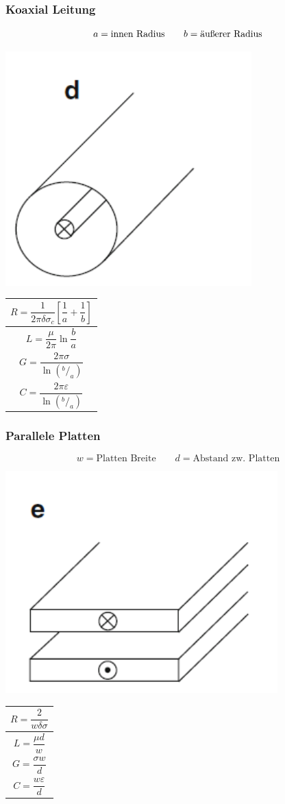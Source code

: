 \subsubsection{Koaxial Leitung}
\[
    a = \text{innen Radius} \qquad b = \text{äußerer Radius} \\
\]

\includegraphics[width=0.4\columnwidth]{Figures/Koaxialleitung.png}
{\renewcommand*{\arraystretch}{0.2}
\begin{tabularx}{0.5\columnwidth}{|X|}
    \hline
    \[R=\frac{1}{2\pi\delta\sigma_c}\left[\frac{1}{a}+\frac{1}{b}\right]\] \\
    \hline
    \[L=\frac{\mu}{2\pi}\ln\frac{b}{a}\]                                   \\
    \hline
    \[G=\frac{2\pi\sigma}{\ln(^b/_a)}\]                                    \\
    \hline
    \[C=\frac{2\pi\varepsilon}{\ln(^b/_a)}\]                               \\
    \hline
\end{tabularx}}

\subsubsection{Parallele Platten}
\[
    w  = \text{Platten Breite} \qquad d  = \text{Abstand zw. Platten}
\]

\includegraphics[width=0.4\columnwidth]{Figures/Parallele_Platten.png}
{\renewcommand*{\arraystretch}{0.2}
\begin{tabularx}{0.5\columnwidth}{|X|}
    \hline
    \[R=\frac{2}{w\delta\sigma}\] \\
    \hline
    \[L=\frac{\mu d}{w}\]          \\
    \hline
    \[G=\frac{\sigma w}{d}\]       \\
    \hline
    \[C=\frac{w\varepsilon}{d}\]  \\
    \hline
\end{tabularx}}

